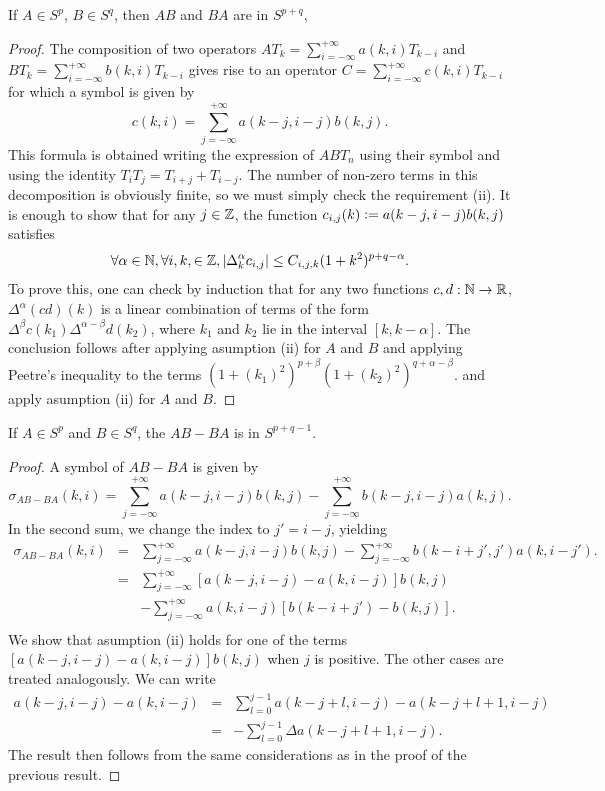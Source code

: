 \documentclass[a4paper]{article}
\begin{document}
\begin{Lem}
	\label{LemCompo}
	If $A \in S^{p}$, $B \in S^{q}$, then $AB$ and $BA$ are in $S^{p + q}$, 
\end{Lem}
\begin{proof}
	The composition of two operators $A T_k = \sum_{i = -\infty}^{+ \infty} a(k,i) T_{k-i}$ and $B T_k = \sum_{i = - \infty}^{+ \infty} b(k,i) T_{k-i}$ gives rise to an operator $C = \sum_{i = - \infty}^{+ \infty} c(k,i) T_{k-i}$ for which a symbol is given by 
	\[c(k,i) = \sum_{j = - \infty}^{+ \infty} a(k - j, i - j) b(k,j).\]
	This formula is obtained writing the expression of $AB T_n$ using their symbol and using the identity $T_i T_j = T_{i + j} + T_{i -j}$. 
	The number of non-zero terms in this decomposition is obviously finite, so we must simply check the requirement (ii). It is enough to show that for any $j \in \mathbb{Z}$, the function $c_{i,j}(k) \mathrel{\mathop:}= a(k-j,i-j) b(k,j)$ satisfies
	\[\forall \alpha \in \mathbb{N}, \forall i,k, \in \mathbb{Z}, \left\lvert \Delta_k^\alpha c_{i,j} \right\rvert \leq C_{i,j,k} (1 + k^2)^{p + q - \alpha}.\]
	To prove this, one can check by induction that for any two functions $c,d : \mathbb{N} \to \mathbb{R}$, $\Delta^\alpha (c d)(k)$ is a linear combination of terms of the form $\Delta^\beta c(k_1) \Delta^{\alpha-\beta} d(k_2)$, where $k_1$ and $k_2$ lie in the interval $[k,k-\alpha]$. The conclusion follows after applying asumption (ii) for $A$ and $B$ and applying Peetre's inequality to the terms $(1 + (k_1)^2)^{p + \beta} (1 + (k_2)^2)^{q + \alpha - \beta}$. 
	and apply asumption (ii) for $A$ and $B$. 
\end{proof}
\begin{Lem}
	If $A \in S^{p}$ and $B \in S^q$, the $AB - BA$ is in $S^{p + q -1}$. 
	\label{CommutPDO}
\end{Lem}
\begin{proof}
	A symbol of $AB - BA$ is given by
	\[\sigma_{AB - BA}(k,i) = \sum_{j = -\infty}^{+\infty} a(k-j,i-j)b(k,j) - \sum_{j = - \infty}^{+\infty} b(k-j,i-j) a(k,j).\]
	In the second sum, we change the index to $j' = i -j$, yielding 
	\begin{eqnarray*}
		\sigma_{AB - BA}(k,i) &=& \sum_{j = -\infty}^{+\infty} a(k-j,i-j)b(k,j) - \sum_{j = - \infty}^{+\infty} b(k-i +j',j') a(k,i-j').\\
		&=& \sum_{j = -\infty}^{+\infty} \left[a(k-j,i-j) - a(k,i-j)\right]b(k,j) \\
		&& - \sum_{j = - \infty}^{+\infty} a(k,i-j) \left[b(k - i + j') -b(k,j)\right].\\
	\end{eqnarray*}
 	We show that asumption (ii) holds for one of the terms $\left[ a(k-j,i-j) - a(k,i-j)\right]b(k,j)$ when $j$ is positive. The other cases are treated analogously. We can write 
\begin{eqnarray*}
	a(k-j,i-j) - a(k,i-j) &=& \sum_{l = 0}^{j-1} a(k-j + l,i-j) - a(k-j + l +  1,i-j)\\
	&=& - \sum_{l = 0}^{j-1} \Delta a(k-j + l+1,i-j).
\end{eqnarray*}
The result then follows from the same considerations as in the proof of the previous result. 
\end{proof}
\end{document}

